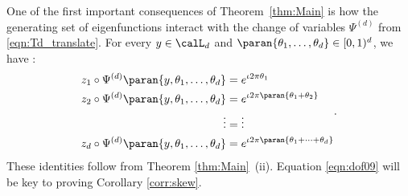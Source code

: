 \documentclass[12pt,oneside]{article}
\newcommand{\Iso}{\Psi}
\begin{document}
One of the first important consequences of Theorem~\ref{thm:Main} is how the generating set of eigenfunctions interact with the change of variables $\Iso^{(d)}$ from \eqref{eqn:Td_translate}. For every $y\in \calL_d$ and $\paran{\theta_1, \ldots, \theta_d} \in [0,1)^d$, we have :
%
\begin{equation} \label{eqn:dof09}
    \begin{split}
        z_1 \circ \Iso^{(d)} \paran{ y, \theta_1, \ldots, \theta_d } &= e^{ \iota 2\pi \theta_1 } \\
        z_2 \circ \Iso^{(d)} \paran{ y, \theta_1, \ldots, \theta_d } &= e^{ \iota 2\pi \paran{\theta_1 + \theta_2} } \\
        \vdots &= \vdots \\
        z_d \circ \Iso^{(d)} \paran{ y, \theta_1, \ldots, \theta_d } &= e^{ \iota 2\pi \paran{\theta_1 + \cdots + \theta_d} } 
    \end{split} .
\end{equation}
%
These identities follow from Theorem \ref{thm:Main}~(ii). Equation \eqref{eqn:dof09} will be key to proving Corollary \ref{corr:skew}. %
\end{document}
